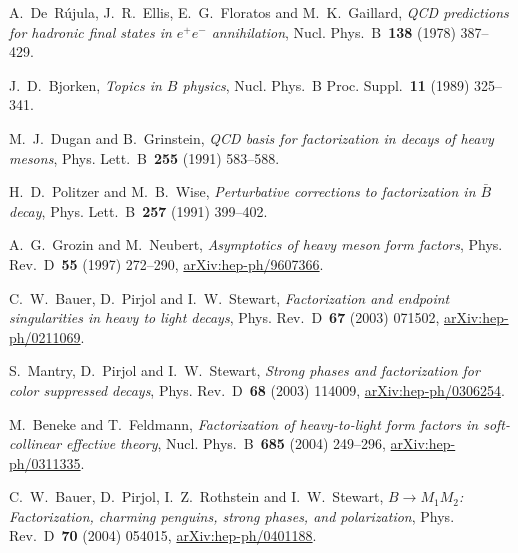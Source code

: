 A.~De~R\'ujula, J.~R.~Ellis, E.~G.~Floratos and M.~K.~Gaillard, \emph{QCD predictions for hadronic final states in $e^+e^-$ annihilation}, Nucl. Phys.~B~\textbf{138} (1978) \mbox{387--429}.

J.~D.~Bjorken, \emph{Topics in $B$ physics}, Nucl. Phys.~B Proc. Suppl.~\textbf{11} (1989) \mbox{325--341}.

M.~J.~Dugan and B.~Grinstein, \emph{QCD basis for factorization in decays of heavy mesons}, Phys. Lett.~B~\textbf{255} (1991) \mbox{583--588}.

H.~D.~Politzer and M.~B.~Wise, \emph{Perturbative corrections to factorization in $\bar B$ decay}, Phys. Lett.~B~\textbf{257} (1991) \mbox{399--402}.

A.~G.~Grozin and M.~Neubert, \emph{Asymptotics of heavy meson form factors}, Phys. Rev.~D~\textbf{55} (1997) \mbox{272--290}, \href{https://arxiv.org/abs/hep-ph/9607366}{arXiv:hep-ph/9607366}.

C.~W.~Bauer, D.~Pirjol and I.~W.~Stewart, \emph{Factorization and endpoint singularities in heavy to light decays}, Phys. Rev.~D~\textbf{67} (2003) \mbox{071502}, \href{https://arxiv.org/abs/hep-ph/0211069}{arXiv:hep-ph/0211069}.

S.~Mantry, D.~Pirjol and I.~W.~Stewart, \emph{Strong phases and factorization for color suppressed decays}, Phys. Rev.~D~\textbf{68} (2003) \mbox{114009}, \href{https://arxiv.org/abs/hep-ph/0306254}{arXiv:hep-ph/0306254}.

M.~Beneke and T.~Feldmann, \emph{Factorization of heavy-to-light form factors in soft-collinear effective theory}, Nucl. Phys.~B~\textbf{685} (2004) \mbox{249--296}, \href{https://arxiv.org/abs/hep-ph/0311335}{arXiv:hep-ph/0311335}.

C.~W.~Bauer, D.~Pirjol, I.~Z.~Rothstein and I.~W.~Stewart, \emph{$B\to M_1M_2$: Factorization, charming penguins, strong phases, and polarization}, Phys. Rev.~D~\textbf{70} (2004) \mbox{054015}, \href{https://arxiv.org/abs/hep-ph/0401188}{arXiv:hep-ph/0401188}.

